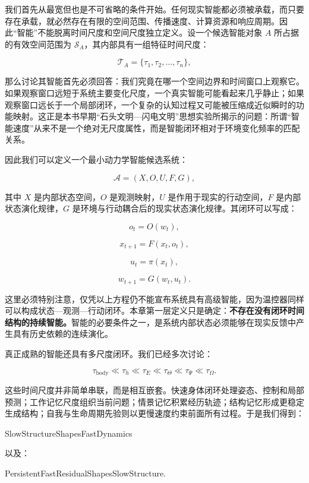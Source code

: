 我们首先从最宽但也是不可省略的条件开始。任何现实智能都必须被承载，而只要存在承载，就必然存在有限的空间范围、传播速度、计算资源和响应周期。因此“智能”不能脱离时间尺度和空间尺度独立定义。设一个候选智能对象 \(A\) 所占据的有效空间范围为 \(\mathcal S_A\)，其内部具有一组特征时间尺度：

\[
\mathcal T_A
=
\{
\tau_1,\tau_2,\ldots,\tau_n
\},
\]

那么讨论其智能首先必须回答：我们究竟在哪一个空间边界和时间窗口上观察它。如果观察窗口远短于系统主要变化尺度，一个真实智能可能看起来几乎静止；如果观察窗口远长于一个局部闭环，一个复杂的认知过程又可能被压缩成近似瞬时的功能映射。这正是本书早期“石头文明—闪电文明”思想实验所揭示的问题：所谓“智能速度”从来不是一个绝对无尺度属性，而是智能闭环相对于环境变化频率的匹配关系。

因此我们可以定义一个最小动力学智能候选系统：

\[
\mathcal A
=
(
X,
O,
U,
F,
G
),
\]

其中 \(X\) 是内部状态空间，\(O\) 是观测映射，\(U\) 是作用于现实的行动空间，\(F\) 是内部状态演化规律，\(G\) 是环境与行动耦合后的现实状态演化规律。其闭环可以写成：

\[
o_t
=
O(w_t),
\]

\[
x_{t+1}
=
F(x_t,o_t),
\]

\[
u_t
=
\pi(x_t),
\]

\[
w_{t+1}
=
G(w_t,u_t).
\]

这里必须特别注意，仅凭以上方程仍不能宣布系统具有高级智能，因为温控器同样可以构成状态—观测—行动闭环。本章第一层定义只是确定：\textbf{不存在没有闭环时间结构的持续智能。}智能的必要条件之一，是系统内部状态必须能够在现实反馈中产生具有历史依赖的连续演化。

真正成熟的智能还具有多尺度闭环。我们已经多次讨论：

\[
\tau_{\mathrm{body}}
\ll
\tau_h
\ll
\tau_E
\ll
\tau_{\Theta}
\ll
\tau_{\Psi}
\ll
\tau_{\Omega}.
\]

这些时间尺度并非简单串联，而是相互嵌套。快速身体闭环处理姿态、控制和局部预测；工作记忆尺度组织当前问题；情景记忆积累经历轨迹；结构记忆形成更稳定生成结构；自我与生命周期先验则以更慢速度约束前面所有过程。于是我们得到：

\begin{statementbox}
SlowStructureShapesFastDynamics
\end{statementbox}

以及：

\begin{statementbox}
PersistentFastResidualShapesSlowStructure.
\end{statementbox}

